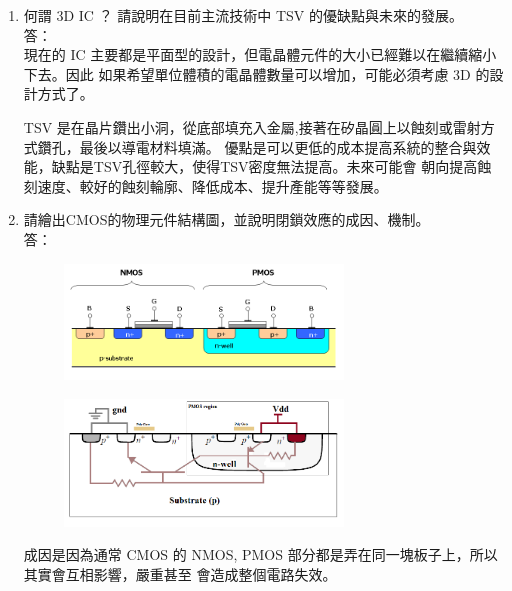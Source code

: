 \documentclass[12pt, a4paper]{article}
\begin{document}
\begin{enumerate}[itemsep=20pt, topsep=10pt]
  \item {何謂 3D IC ？ 請說明在目前主流技術中 TSV 的優缺點與未來的發展。} \\[10pt]
    答：\\
    現在的 IC 主要都是平面型的設計，但電晶體元件的大小已經難以在繼續縮小下去。因此
    如果希望單位體積的電晶體數量可以增加，可能必須考慮 3D 的設計方式了。

    TSV 是在晶片鑽出小洞，從底部填充入金屬,接著在矽晶圓上以蝕刻或雷射方式鑽孔，最後以導電材料填滿。
    優點是可以更低的成本提高系統的整合與效能，缺點是TSV孔徑較大，使得TSV密度無法提高。未來可能會
    朝向提高蝕刻速度、較好的蝕刻輪廓、降低成本、提升產能等等發展。
    
  \item {請繪出CMOS的物理元件結構圖，並說明閉鎖效應的成因、機制。} \\[10pt]
    答：\\
    \begin{figure}[H]
    \begin{center}
      \includegraphics[width=0.7\textwidth]{cmos.png}
    \end{center}
    \caption{}
    \end{figure}

    \begin{figure}[H]
    \begin{center}
      \includegraphics[width=0.7\textwidth]{latchup.png}
    \end{center}
    \caption{}
    \end{figure}

    成因是因為通常 CMOS 的 NMOS, PMOS 部分都是弄在同一塊板子上，所以其實會互相影響，嚴重甚至
    會造成整個電路失效。


\end{enumerate}
\end{document}

